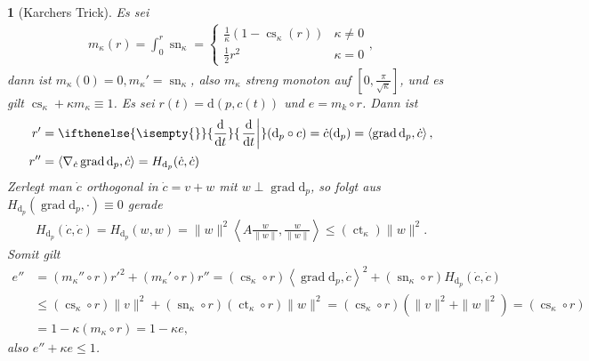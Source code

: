 \documentclass[paper=A4, twoside, chapterprefix=true, bibliography=totoc, headsepline]{scrbook}
\newcommand{\tikzgitter}[3][0.25]{
	\draw[step=#1,gray!15] #2 grid #3;
	\draw[step=2*#1,gray!30] #2 grid #3;
	\fill (0,0) circle(0.1); 
}
\DeclareMathOperator{\cs}{cs}       %
\DeclareMathOperator{\ct}{ct}       %
\DeclareMathOperator{\grad}{grad}   %
\DeclareMathOperator{\sn}{sn}       %
\newcommand{\dop}{\mathrm{d}}
\newcommand{\difffrac}[3][]{\ifthenelse{\isempty{#1}}{\frac{\dop #2}{\dop #3}}{\left. \frac{\dop #2}{\dop #3} \right|_{#1}}}
\theoremstyle{plain}
\theoremstyle{nonumberplain}
\theoremstyle{empty}
\newtheorem{emptythm}{}%
\theoremstyle{break}
\begin{document}
\begin{emptythm}[Karchers Trick]
  Es sei
  \begin{align*}
    m_{\kappa}(r) = \int_0^r \sn_{\kappa}
    = \begin{cases}
      \frac{1}{\kappa}(1-\cs_{\kappa}(r)) & \kappa \neq 0\\
      \frac{1}{2}r^2 & \kappa = 0
    \end{cases},
  \end{align*}
  dann ist $m_{\kappa}(0) = 0, m_{\kappa}' = \sn_{\kappa}$, also $m_{\kappa}$ streng monoton auf $[0,\frac{\pi}{\sqrt{\kappa}}]$, und es gilt $\cs_{\kappa} + \kappa m_{\kappa} \equiv 1$.
  Es sei $r(t) = \dop(p, c(t))$ und $e = m_k \circ r$.
  Dann ist
  \begin{align*}
    r' & = \difffrac{}{t}(\dop_p \circ c) = \dot c(\dop_p) = \left<\grad \dop_p,\dot c\right>,\\
    r'' & = \left<\nabla_{\dot c} \grad \dop_p,\dot c\right> = H_{\dop_p}(\dot c, \dot c)
  \end{align*}
  Zerlegt man $\dot c$ orthogonal in $\dot c = v + w$ mit $w \perp \grad \dop_p$, so folgt aus $H_{\dop_p}(\grad \dop_p, \cdot) \equiv 0$ gerade
  \begin{align*}
    H_{\dop_p}(\dot c,\dot c) = H_{\dop_p}(w,w)
    = \|w\|^2\left\langle A \frac{w}{\|w\|},\frac{w}{\|w\|}\right\rangle
    \leq (\ct_{\kappa}) \|w\|^2.
  \end{align*}
  Somit gilt
  \begin{align*}
    e'' & = (m_{\kappa}''\circ r)r'^2 + (m_{\kappa}' \circ r) r''
    = (\cs_{\kappa} \circ r) \left<\grad \dop_p,\dot c\right>^2 + (\sn_{\kappa} \circ r)H_{\dop_p}(\dot c, \dot c)\\
    & \leq (\cs_{\kappa} \circ r)\|v\|^2 + (\sn_{\kappa} \circ r)(\ct_{\kappa} \circ r)\|w\|^2
    = (\cs_{\kappa} \circ r)(\|v\|^2 + \|w\|^2)
    = (\cs_{\kappa} \circ r)\\
    & = 1 - \kappa(m_{\kappa} \circ r)
    = 1 - \kappa e,
  \end{align*}
  also $e'' + \kappa e \leq 1$.
  \begin{center}
\end{center}
\end{emptythm}
\end{document}
